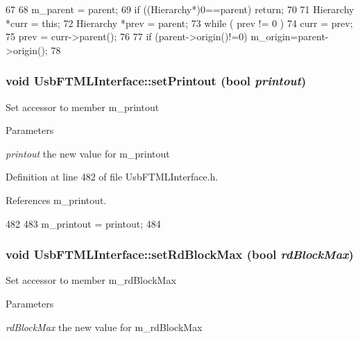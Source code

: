 \begin{DoxyCode}
67                                               {
68   m_parent = parent;
69   if ((Hierarchy*)0==parent) return;
70 
71   Hierarchy *curr = this;
72   Hierarchy *prev = parent;
73   while ( prev != 0 ){
74     curr = prev;
75     prev = curr->parent();
76   }
77   if (parent->origin()!=0) m_origin=parent->origin();
78 }
\end{DoxyCode}
\hypertarget{classUsbFTMLInterface_a807c9a67253303a7bc1b14558b9819ac}{
\subsubsection[{setPrintout}]{\setlength{\rightskip}{0pt plus 5cm}void UsbFTMLInterface::setPrintout (bool {\em printout})}}
\label{classUsbFTMLInterface_a807c9a67253303a7bc1b14558b9819ac}
Set accessor to member m\_\-printout 
\begin{DoxyParams}{Parameters}
\item[{\em printout}]the new value for m\_\-printout \end{DoxyParams}


Definition at line 482 of file UsbFTMLInterface.h.

References m\_\-printout.


\begin{DoxyCode}
482                                    {
483     m_printout = printout;
484   }
\end{DoxyCode}
\hypertarget{classUsbFTMLInterface_abdd0b79fb1d8a17c6a97969a291b858b}{
\subsubsection[{setRdBlockMax}]{\setlength{\rightskip}{0pt plus 5cm}void UsbFTMLInterface::setRdBlockMax (bool {\em rdBlockMax})}}
\label{classUsbFTMLInterface_abdd0b79fb1d8a17c6a97969a291b858b}
Set accessor to member m\_\-rdBlockMax 
\begin{DoxyParams}{Parameters}
\item[{\em rdBlockMax}]the new value for m\_\-rdBlockMax \end{DoxyParams}



